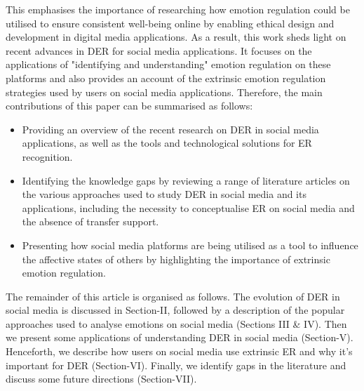 \documentclass[lettersize,journal]{IEEEtran}
\begin{document}
This emphasises the importance of researching how emotion regulation could be utilised to ensure consistent well-being online by enabling ethical design and development in digital media applications. As a result, this work sheds light on recent advances in DER for social media applications. It focuses on the applications of "identifying and understanding" emotion regulation on these platforms and also provides an account of the extrinsic emotion regulation strategies used by users on social media applications. Therefore, the main contributions of this paper can be summarised as follows:
\begin{itemize} 
    \item Providing an overview of the recent research on DER in social media applications, as well as the tools and technological solutions for ER recognition. 
    \item Identifying the knowledge gaps by reviewing a range of literature articles on the various approaches used to study DER in social media and its applications, including the necessity to conceptualise ER on social media and the absence of transfer support. 
    \item Presenting how social media platforms are being utilised as a tool to influence the affective states of others by highlighting the importance of extrinsic emotion regulation.

\end{itemize}

The remainder of this article is organised as follows. The evolution of DER in social media is discussed in Section-II, followed by a description of the popular approaches used to analyse emotions on social media (Sections III \& IV). Then we present some applications of understanding DER in social media  (Section-V). Henceforth, we describe how users on social media use extrinsic ER and why it's important for DER (Section-VI). Finally, we identify gaps in the literature and discuss some future directions (Section-VII).
\end{document}
